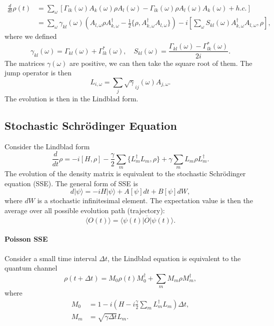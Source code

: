 \documentclass[aps,prb,superscriptaddress,nofootinbib]{revtex4}
\begin{document}
\begin{equation}
\begin{aligned}
	\frac{d}{dt}\rho(t) &= \sum_{\omega} \left[\Gamma_{lk}(\omega) A_k(\omega) \rho A_l(\omega) - \Gamma_{lk}(\omega)\rho A_l(\omega) A_k(\omega) + h.c. \right] \\
	&= \sum_{\omega} \gamma_{kl}(\omega)(A_{l,\omega}\rho A_{k,\omega}^\dagger-\frac{1}{2}\{\rho,A_{k,\omega}^\dagger A_{l,\omega}\}) -i\left[\sum_{\omega}S_{kl}(\omega)A_{k,\omega}^\dagger A_{l,\omega},\rho\right],
\end{aligned}
\end{equation}
where we defined
\begin{equation}
	\gamma_{kl}(\omega) = \Gamma_{kl}(\omega) +\Gamma^*_{lk}(\omega), \quad
	S_{kl}(\omega) = \frac{\Gamma_{kl}(\omega) - \Gamma^*_{lk}(\omega)}{2i}.
\end{equation}
The matrices $\gamma(\omega)$ are positive, we can then take the square root of them.
The jump operator is then
\begin{equation}
	L_{i,\omega} = \sum_j \sqrt{\gamma}_{ij}(\omega)A_{j,\omega}.
\end{equation}
The evolution is then in the Lindblad form.


\subsection{Stochastic Schr\"{o}dinger Equation}

Consider the Lindblad form
\begin{equation}
	\frac{d}{dt}\rho = -i[H,\rho] -\frac{\gamma}{2}\sum_m \{L_m^\dagger L_m, \rho\} + \gamma\sum_m L_m\rho L_m^\dagger.
\end{equation}
The evolution of the density matrix is equivalent to the stochastic Schr\"{o}dinger equation (SSE).
The general form of SSE is
\begin{equation}
	d|\psi\rangle = -iH|\psi\rangle + A[\psi]dt + B[\psi]dW,
\end{equation}
where $dW$ is a stochastic infinitesimal element.
The expectation value is then the average over all possible evolution path (trajectory):
\begin{equation}
	\langle O(t) \rangle = \overline{\langle\psi(t)|O|\psi(t)\rangle}.
\end{equation}

\paragraph*{Poisson SSE}
Consider a small time interval $\Delta t$, the Lindblad equation is equivalent to the quantum channel
\begin{equation}
	\rho(t+\Delta t) = M_0 \rho(t) M_0^\dagger + \sum_m M_m \rho M_m^\dagger, 
\end{equation}
where
\begin{equation}
\begin{aligned}
	M_0 &= 1 - i\left(H - i\frac{\gamma}{2} \sum_m L_m^\dagger L_m\right)\Delta t, \\
	M_m &= \sqrt{\gamma\Delta t} L_m.
\end{aligned}
\end{equation}
\end{document}
